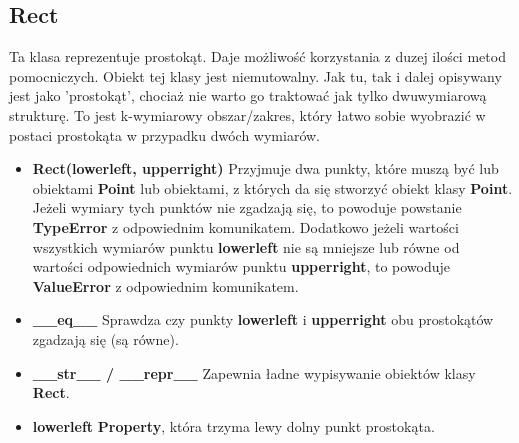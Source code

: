 \documentclass[a4paper, 12pt]{article}
\begin{document}
    \subsection{Rect}
      \quad Ta klasa reprezentuje prostokąt. Daje możliwość korzystania z duzej ilości metod pomocniczych. Obiekt tej klasy jest niemutowalny. Jak tu, tak i dalej opisywany jest jako 'prostokąt', chociaż nie warto go traktować jak tylko dwuwymiarową strukturę. To jest k-wymiarowy obszar/zakres, który łatwo sobie wyobrazić w postaci prostokąta w przypadku dwóch wymiarów.

      \begin{itemize}
          \item \textbf{Rect(lowerleft, upperright)} \vspace{6pt}\newline
          \quad Przyjmuje dwa punkty, które muszą być lub obiektami \textbf{Point} lub obiektami, z których da się stworzyć obiekt klasy \textbf{Point}. Jeżeli wymiary tych punktów nie zgadzają się, to powoduje powstanie \textbf{TypeError} z odpowiednim komunikatem. Dodatkowo jeżeli wartości wszystkich wymiarów punktu \textbf{lowerleft} nie są mniejsze lub równe od wartości odpowiednich wymiarów punktu \textbf{upperright}, to powoduje \textbf{ValueError} z odpowiednim komunikatem.
          \vspace{6pt}
          
          \item \textbf{\_\_eq\_\_} \vspace{6pt}\newline
          \quad Sprawdza czy punkty \textbf{lowerleft} i \textbf{upperright} obu prostokątów zgadzają się (są równe).
          \vspace{6pt}
          
          \item \textbf{\_\_str\_\_ / \_\_repr\_\_} \vspace{6pt}\newline
          \quad Zapewnia ładne wypisywanie obiektów klasy \textbf{Rect}.
          \vspace{6pt}
          
          \item \textbf{lowerleft} \vspace{6pt}\newline
          \quad \textbf{Property}, która trzyma lewy dolny punkt prostokąta.
          \vspace{6pt}
          

\end{itemize}
\end{document}
